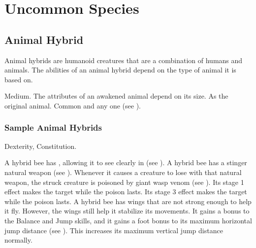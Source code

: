 \chapter{Uncommon Species}\label{Uncommon Species}

\section{Animal Hybrid}
    Animal hybrids are humanoid creatures that are a combination of humans and animals.
    The abilities of an animal hybrid depend on the type of animal it is based on.

     Medium.
     The attributes of an awakened animal depend on its size.
     As the original animal.
     Common and any one  (see ).

    \subsection{Sample Animal Hybrids}


          Dexterity,  Constitution.
        \begin{itemize}
             A hybrid bee has , allowing it to see clearly in  (see ).
             A hybrid bee has a stinger natural weapon (see ).
                Whenever it causes a creature to lose  with that natural weapon, the struck creature is poisoned by giant wasp venom (see ).
                Its stage 1 effect makes the target \slowed while the poison lasts.
                Its stage 3 effect makes the target \immobilized while the poison lasts.
             A hybrid bee has wings that are not strong enough to help it fly.
                However, the wings still help it stabilize its movements.
                It gains a  bonus to the Balance and Jump skills, and it gains a  foot bonus to its maximum horizontal jump distance (see ).
                This increases its maximum vertical jump distance normally.
        \end{itemize}

